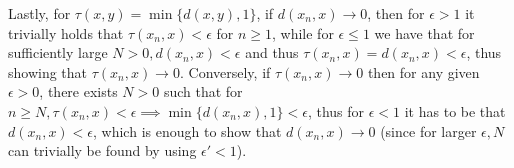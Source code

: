 \begin{solution}
     Lastly, for $\tau(x, y) = \min\{d(x, y), 1\}$, if $d(x_n, x) \rightarrow 0$, then for $\epsilon > 1$ it trivially holds that $\tau(x_n, x) < \epsilon$ for $n \geq 1$, while for $\epsilon \leq 1$ we have that for sufficiently large $N > 0, d(x_n, x) < \epsilon$ and thus $\tau(x_n, x) = d(x_n, x) < \epsilon$, thus showing that $\tau(x_n, x) \rightarrow 0$.
     Conversely, if $\tau(x_n, x) \rightarrow 0$ then for any given $\epsilon > 0$, there exists $N > 0$ such that for $n \geq N, \tau(x_n, x) < \epsilon \implies \min\{d(x_n, x), 1\} < \epsilon$, thus for $\epsilon < 1$ it has to be that $d(x_n, x) < \epsilon$, which is enough to show that $d(x_n, x) \rightarrow 0$ (since for larger $\epsilon, N$ can trivially be found by using $\epsilon' < 1$).
\end{solution}